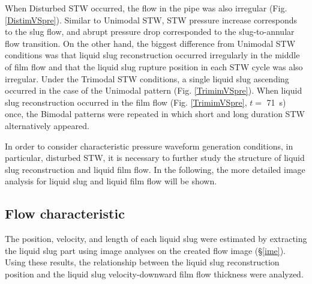 \documentclass[aps,pre,preprint,groupedaddress,showkeys]{revtex4-2}
\begin{document}
When Disturbed STW occurred, the flow in the pipe was also irregular (Fig. \ref{DistimVSpre}).
Similar to Unimodal STW, STW pressure increase corresponds to the slug flow, and abrupt pressure drop corresponded to the slug-to-annular flow transition. 
On the other hand, the biggest difference from Unimodal STW conditions was that liquid slug reconstruction occurred irregularly in the middle of film flow and that the liquid slug rupture position in each STW cycle was also irregular.
Under the Trimodal STW conditions, a single liquid slug ascending occurred in the case of the Unimodal pattern (Fig. \ref{TrimimVSpre}).
When liquid slug reconstruction occurred in the film flow (Fig. \ref{TrimimVSpre}, $ t = $ \SI{71}{s}) once, the Bimodal patterns were repeated in which short and long duration STW alternatively appeared.

In order to consider characteristic pressure waveform generation conditions, in particular, disturbed STW, it is necessary to further study the structure of liquid slug reconstruction and liquid film flow.
In the following, the more detailed image analysis for liquid slug and liquid film flow will be shown.

\subsection{Flow characteristic}
The position, velocity, and length of each liquid slug were estimated by extracting the liquid slug part using image analyses on the created flow image (\S \ref{ime}).
Using these results, the relationship between the liquid slug reconstruction position and the liquid slug velocity-downward film flow thickness were analyzed.
\end{document}
